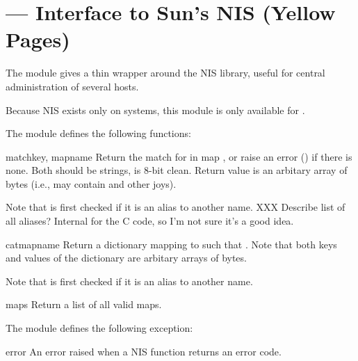 \section{ ---
         Interface to Sun's NIS (Yellow Pages)}


The  module gives a thin wrapper around the NIS library, useful
for central administration of several hosts.

Because NIS exists only on \UNIX{} systems, this module is
only available for \UNIX{}.

The  module defines the following functions:

\begin{funcdesc}{match}{key, mapname}
Return the match for  in map , or raise an
error () if there is none.
Both should be strings,  is 8-bit clean.
Return value is an arbitary array of bytes (i.e., may contain 
and other joys).

Note that  is first checked if it is an alias to another name.
XXX Describe list of all aliases? Internal for the C code, so
    I'm not sure it's a good idea.
\end{funcdesc}

\begin{funcdesc}{cat}{mapname}
Return a dictionary mapping  to  such that
.
Note that both keys and values of the dictionary are arbitary
arrays of bytes.

Note that  is first checked if it is an alias to another name.
\end{funcdesc}

\begin{funcdesc}{maps}{}
Return a list of all valid maps.
\end{funcdesc}


The  module defines the following exception:

\begin{excdesc}{error}
An error raised when a NIS function returns an error code.
\end{excdesc}
